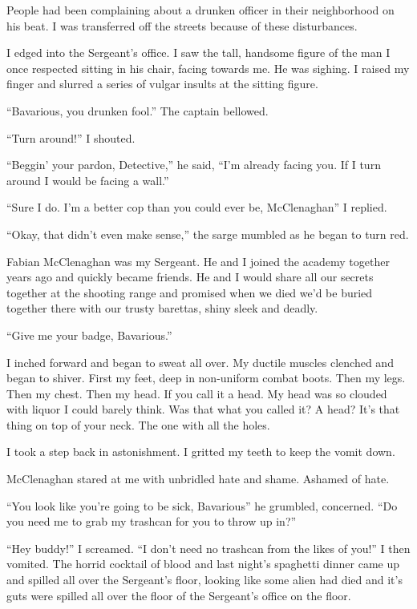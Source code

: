 People had been complaining about a drunken officer in their
neighborhood on his beat. I was transferred off the streets because
of these disturbances.

I edged into the Sergeant's office. I saw the tall, handsome figure
of the man I once respected sitting in his chair, facing towards
me. He was sighing. I raised my finger and slurred a series of
vulgar insults at the sitting figure.

``Bavarious, you drunken fool.'' The captain bellowed.

``Turn around!'' I shouted.

``Beggin' your pardon, Detective,'' he said, ``I'm already facing you.
If I turn around I would be facing a wall.''

``Sure I do. I'm a better cop than you could ever be, McClenaghan'' I
replied.

``Okay, that didn't even make sense,'' the sarge mumbled as he began
to turn red.

Fabian McClenaghan was my Sergeant. He and I joined the academy
together years ago and quickly became friends. He and I would share
all our secrets together at the shooting range and promised when we
died we'd be buried together there with our trusty barettas, shiny
sleek and deadly.

``Give me your badge, Bavarious.''

I inched forward and began to sweat all over. My ductile muscles
clenched and began to shiver. First my feet, deep in non-uniform
combat boots. Then my legs. Then my chest. Then my head. If you
call it a head. My head was so clouded with liquor I could barely
think. Was that what you called it? A head? It's that thing on top
of your neck. The one with all the holes.

I took a step back in astonishment. I gritted my teeth to keep the
vomit down.

McClenaghan stared at me with unbridled hate and shame. Ashamed of
hate.

``You look like you're going to be sick, Bavarious'' he grumbled,
concerned. ``Do you need me to grab my trashcan for you to throw up
in?''

``Hey buddy!'' I screamed. ``I don't need no trashcan from the likes
of you!'' I then vomited. The horrid cocktail of blood and last
night's spaghetti dinner came up and spilled all over the
Sergeant's floor, looking like some alien had died and it's guts
were spilled all over the floor of the Sergeant's office on the
floor.

